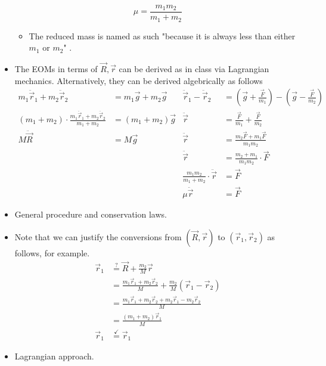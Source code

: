\documentclass[../notes.tex]{subfiles}
\begin{document}
\begin{itemize}
    \begin{equation*}
        \mu = \frac{m_1m_2}{m_1+m_2}
    \end{equation*}
    \begin{itemize}
        \item The reduced mass is named as such "because it is always less than either $m_1$ or $m_2$" \parencite[160]{bib:KibbleBerkshire}.
    \end{itemize}
    \item The EOMs in terms of $\vec{R},\vec{r}$ can be derived as in class via Lagrangian mechanics. Alternatively, they can be derived algebrically as follows
    \begin{align*}
        m_1\ddot{\vec{r}}_1+m_2\ddot{\vec{r}}_2 &= m_1\vec{g}+m_2\vec{g}&
            \ddot{\vec{r}}_1-\ddot{\vec{r}}_2 &= \left( \vec{g}+\frac{\vec{F}}{m_1} \right)-\left( \vec{g}-\frac{\vec{F}}{m_2} \right)\\
        (m_1+m_2)\cdot\frac{m_1\ddot{\vec{r}}_1+m_2\ddot{\vec{r}}_2}{m_1+m_2} &= (m_1+m_2)\vec{g}&
            \ddot{\vec{r}} &= \frac{\vec{F}}{m_1}+\frac{\vec{F}}{m_2}\\
        M\ddot{\vec{R}} &= M\vec{g}&
            \ddot{\vec{r}} &= \frac{m_2\vec{F}+m_1\vec{F}}{m_1m_2}\\
        &&
            \ddot{\vec{r}} &= \frac{m_2+m_1}{m_1m_2}\cdot\vec{F}\\
        &&
            \frac{m_1m_2}{m_1+m_2}\cdot\ddot{\vec{r}} &= \vec{F}\\
        &&
            \mu\ddot{\vec{r}} &= \vec{F}
    \end{align*}
    \item General procedure and conservation laws.
    \item Note that we can justify the conversions from $(\vec{R},\vec{r})$ to $(\vec{r}_1,\vec{r}_2)$ as follows, for example.
    \begin{align*}
        \vec{r}_1 &\stackrel{?}{=} \vec{R}+\frac{m_2}{M}\vec{r}\\
        &= \frac{m_1\vec{r}_1+m_2\vec{r}_2}{M}+\frac{m_2}{M}(\vec{r}_1-\vec{r}_2)\\
        &= \frac{m_1\vec{r}_1+m_2\vec{r}_2+m_2\vec{r}_1-m_2\vec{r}_2}{M}\\
        &= \frac{(m_1+m_2)\vec{r}_1}{M}\\
        \vec{r}_1 &\stackrel{\checkmark}{=} \vec{r}_1
    \end{align*}
    \item Lagrangian approach.
    \begin{itemize}

\end{itemize}
\end{itemize}
\end{document}
